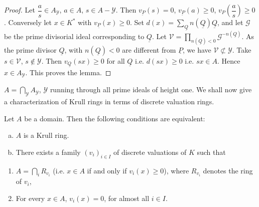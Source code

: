\begin{proof}
Let $\dfrac{a}{s} \in A_\mathscr{Y}$, $a \in A$, $s \in A -
\mathscr{Y}$. Then $v_{\underbar{P}}(s) = 0$, $v_{\underbar{P}} (a)
\geq 0$,
$v_{P} \left(\dfrac{a}{s} \right) \ge 0$. Conversely let $x \in K^*$
with $v_{\underline{P}} (x) \ge 0$. Set $d(x) =
\sum\limits_{\underline{Q}} n (\underline{Q}) \underline{Q}$, and let
$\mathscr{G}$ 
be the prime divisorial ideal corresponding  to $\underline{Q}$. Let
$\mathscr{V} = \prod\limits_{n (\underline{Q}) < 0} \mathscr{G}^{-n
  (\underline{Q})} $. As the prime divisor $\underline{Q}$, with $n
(\underline{Q}) < 0$ are different from $\underline{P}$, we have
$\mathscr{V} \nsubset \mathscr{Y}$. Take $s \in \mathscr{V}$, $s \notin
\mathscr{Y}$. Then $v_{\underline{Q}}(sx) \ge 0$ for all
$\underline{Q}$ i.e. $d(sx) \ge 0$ i.e. $sx \in A$. Hence $x \in
A_\mathscr{Y}$. This proves the lemma. 
\end{proof}  
  
\begin{coro*}
$A = \bigcap\limits_{\mathscr{Y}} A_\mathscr{Y}$, $\mathscr{Y}$
    running through all prime ideals of height one. We shall now give
    a characterization of Krull rings in terms of discrete valuation
    rings. 
\end{coro*}  
  
\setcounter{theorem}{4}
\begin{theorem}\label{chap1:thm3.5}%
 Let $A$ be a domain. Then the following conditions are equivalent:  
\begin{enumerate}[(a)]
\item $A$ is a Krull ring.

\item  There exists a family $(v_i)_{i  \in I}$ of discrete
  valuations of $K$ such that 
\end{enumerate}
\begin{enumerate}[(1)]
 \item $ A = \bigcap\limits_i R_{v_i}$ (i.e. $x \in A$ if and only if
   $v_i (x) \ge 0$), where $R_{v_i}$ denotes  the ring of $v_i$, 

 \item For every $x \in A$, $v_i (x) = 0$, for almost all $i \in
   I$. 
\end{enumerate}
\end{theorem}   
  
